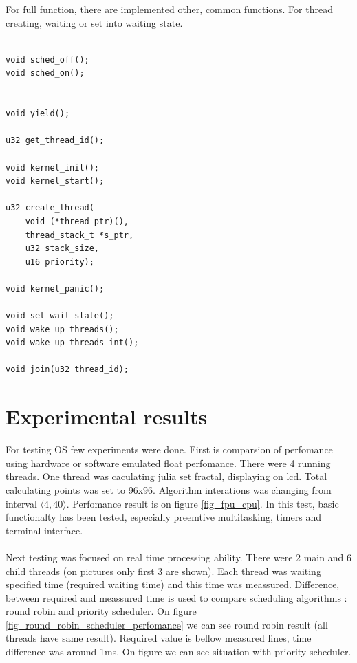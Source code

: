 \documentclass[conference]{IEEEtran}
\begin{document}
For full function, there are implemented other, common functions. For thread creating, waiting or set into waiting state.

\noindent\begin{minipage}{.45\textwidth}
\lstset{language=C++}    
\begin{lstlisting}[frame=single, caption = kernel functions]

void sched_off();
void sched_on();


void yield();

u32 get_thread_id();

void kernel_init();
void kernel_start();

u32 create_thread(
	void (*thread_ptr)(), 
	thread_stack_t *s_ptr, 
	u32 stack_size, 
	u16 priority);	

void kernel_panic();

void set_wait_state();
void wake_up_threads();
void wake_up_threads_int();

void join(u32 thread_id);

\end{lstlisting}
\end{minipage}\hfill



\section{Experimental results}

For testing OS few experiments were done. First is comparsion of perfomance using hardware or software emulated float perfomance.
There were 4 running threads. One thread was caculating julia set fractal, displaying on lcd. Total calculating points was set to 96x96.
Algorithm interations was changing from interval $\langle 4, 40 \rangle$. Perfomance result is on figure \ref{fig_fpu_cpu}. In this test, basic functionalty has been tested, especially preemtive multitasking, timers and terminal interface. \\
\\
Next testing was focused on real time processing ability. There were 2 main and 6 child threads (on pictures only first 3 are shown). Each thread was waiting specified time (required waiting time) and this time was meassured. Difference, between required and meassured time is used to compare scheduling algorithms : round robin and priority scheduler. On figure \ref{fig_round_robin_scheduler_perfomance} we can see round robin result (all threads have same result). Required value is bellow measured lines, time difference was around 1ms.
On figure \label{fig_priority_scheduler_perfomance} we can see situation with priority scheduler. 
\end{document}
